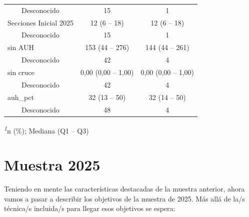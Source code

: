 \documentclass[
  spanish,
  a4paper,
]{scrreprt}
\begin{document}
\begin{table}
{\begin{tabular*}{\linewidth}{@{\extracolsep{\fill}}lcc}
    Desconocido & 15 & 1 \\ 
Secciones Inicial 2025 & 12 (6 – 18) & 12 (6 – 18) \\ 
    Desconocido & 15 & 1 \\ 
sin AUH & 153 (44 – 276) & 144 (44 – 261) \\ 
    Desconocido & 42 & 4 \\ 
sin cruce & 0,00 (0,00 – 1,00) & 0,00 (0,00 – 1,00) \\ 
    Desconocido & 42 & 4 \\ 
auh\_pct & 32 (13 – 50) & 32 (14 – 50) \\ 
    Desconocido & 48 & 4 \\ 
\bottomrule
\end{tabular*}
\begin{minipage}{\linewidth}
\textsuperscript{\textit{1}}n (\%); Mediana (Q1 -- Q3)\\
\end{minipage}

}

\end{table}%

\section{Muestra 2025}\label{muestra-2025}

Teniendo en mente las características destacadas de la muestra anterior,
ahora vamos a pasar a describir los objetivos de la muestra de 2025. Más
allá de la/s técnica/s incluida/s para llegar esos objetivos se espera:
\end{document}
